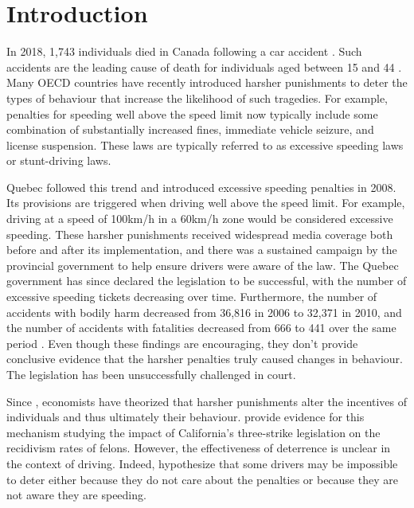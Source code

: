 \section{Introduction}
\label{sec:Introduction}

In 2018, 1,743 individuals died in Canada following a car accident 
\citep{transcan2018}. 
Such accidents are the leading cause of death for individuals aged between 15 and 44
\citep{statscan2020}.   
Many OECD countries have recently introduced harsher punishments to deter 
the types of behaviour that increase the likelihood of such tragedies. 
For example, penalties for speeding well above the speed limit now typically include 
some combination of substantially increased fines, immediate vehicle seizure, and license suspension.
These laws are typically referred to as excessive speeding laws or stunt-driving laws. 

Quebec followed this trend and introduced excessive speeding penalties in 2008. 
Its provisions are triggered when driving well above the speed limit. 
For example, driving at a speed of 100km/h in a 60km/h zone would be considered excessive speeding.
These harsher punishments received widespread media coverage 
both before and after its implementation, 
and there was a sustained campaign by the provincial government 
to help ensure drivers were aware of the law. 
The Quebec government has since declared the legislation to be successful, 
with the number of excessive speeding tickets decreasing over time. 
Furthermore, the number of accidents with bodily harm 
decreased from 36,816 in 2006 to 32,371 in 2010, 
and the number of accidents with fatalities decreased from 666 to 441 
over the same period 
\citep{saaq2011}. 
Even though these findings are encouraging, 
they don’t provide conclusive evidence that the harsher penalties truly caused changes in behaviour. 
The legislation has been unsuccessfully challenged in court.

Since 
\citet{becker1968b}, 
economists have theorized that harsher punishments 
alter the incentives of individuals and thus ultimately their behaviour. 
\citet{hellandtabarrok2007} 
provide evidence for this mechanism 
studying the impact of California’s three-strike legislation on the recidivism rates of felons. 
However, the effectiveness of deterrence is unclear in the context of driving. 
Indeed, 
\citet{bourgeonpicard2007} 
hypothesize that some drivers may be impossible to deter 
either because they do not care about the penalties or because they are not aware they are speeding.


